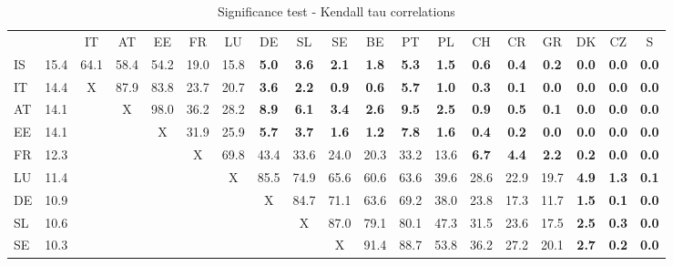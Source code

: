 \begin{table}[htbp]
  \centering
  \caption{Significance test - Kendall tau correlations}
    \begin{tabular}{lrccccccccccccccccc}
          &       & IT    & AT    & EE    & FR    & LU    & DE    & SL    & SE    & BE    & PT    & PL    & CH    & CR    & GR    & DK    & CZ    & S \\
    IS    & 15.4 & 64.1 & 58.4 & 54.2 & 19.0 & 15.8 & \textbf{5.0} & \textbf{3.6} & \textbf{2.1} & \textbf{1.8} & \textbf{5.3} & \textbf{1.5} & \textbf{0.6} & \textbf{0.4} & \textbf{0.2} & \textbf{0.0} & \textbf{0.0} & \textbf{0.0} \\
    IT    & 14.4 & X     & 87.9 & 83.8 & 23.7 & 20.7 & \textbf{3.6} & \textbf{2.2} & \textbf{0.9} & \textbf{0.6} & \textbf{5.7} & \textbf{1.0} & \textbf{0.3} & \textbf{0.1} & \textbf{0.0} & \textbf{0.0} & \textbf{0.0} & \textbf{0.0} \\
    AT    & 14.1 &       & X     & 98.0 & 36.2 & 28.2 & \textbf{8.9} & \textbf{6.1} & \textbf{3.4} & \textbf{2.6} & \textbf{9.5} & \textbf{2.5} & \textbf{0.9} & \textbf{0.5} & \textbf{0.1} & \textbf{0.0} & \textbf{0.0} & \textbf{0.0} \\
    EE    & 14.1 &       &       & X     & 31.9 & 25.9 & \textbf{5.7} & \textbf{3.7} & \textbf{1.6} & \textbf{1.2} & \textbf{7.8} & \textbf{1.6} & \textbf{0.4} & \textbf{0.2} & \textbf{0.0} & \textbf{0.0} & \textbf{0.0} & \textbf{0.0} \\
    FR    & 12.3 &       &       &       & X     & 69.8 & 43.4 & 33.6 & 24.0 & 20.3 & 33.2 & 13.6 & \textbf{6.7} & \textbf{4.4} & \textbf{2.2} & \textbf{0.2} & \textbf{0.0} & \textbf{0.0} \\
    LU    & 11.4 &       &       &       &       & X     & 85.5 & 74.9 & 65.6 & 60.6 & 63.6 & 39.6 & 28.6 & 22.9 & 19.7 & \textbf{4.9} & \textbf{1.3} & \textbf{0.1} \\
    DE    & 10.9 &       &       &       &       &       & X     & 84.7 & 71.1 & 63.6 & 69.2 & 38.0 & 23.8 & 17.3 & 11.7 & \textbf{1.5} & \textbf{0.1} & \textbf{0.0} \\
    SL    & 10.6 &       &       &       &       &       &       & X     & 87.0 & 79.1 & 80.1 & 47.3 & 31.5 & 23.6 & 17.5 & \textbf{2.5} & \textbf{0.3} & \textbf{0.0} \\
    SE    & 10.3 &       &       &       &       &       &       &       & X     & 91.4 & 88.7 & 53.8 & 36.2 & 27.2 & 20.1 & \textbf{2.7} & \textbf{0.2} & \textbf{0.0} \\

\end{tabular}
\end{table}
